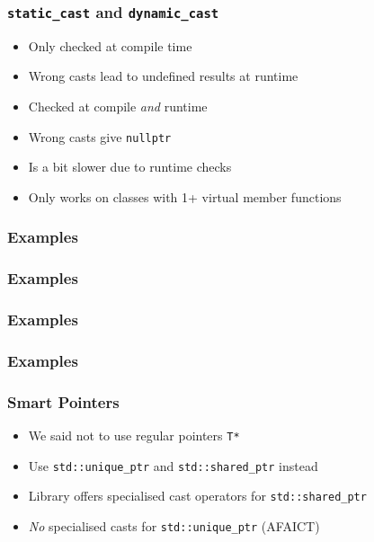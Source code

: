 \begin{frame}
  \frametitle{\texttt{static\_cast} and \texttt{dynamic\_cast}}
  \begin{itemize}
    \item Only checked at compile time
    \item Wrong casts lead to undefined results at runtime
  \end{itemize}
  \vskip5mm
  \begin{itemize}
    \item Checked at compile \emph{and} runtime
    \item Wrong casts give \texttt{nullptr}
    \item Is a bit slower due to runtime checks
    \item Only works on classes with 1+ virtual member functions
  \end{itemize}
\end{frame}

\begin{frame}
  \frametitle{Examples}
\end{frame}

\begin{frame}
  \frametitle{Examples}
\end{frame}

\begin{frame}
  \frametitle{Examples}
\end{frame}

\begin{frame}
  \frametitle{Examples}
\end{frame}

\begin{frame}
  \frametitle{Smart Pointers}
  \begin{itemize}
    \item We said not to use regular pointers {\tt T*}
    \item Use {\tt std::unique\_ptr} and {\tt std::shared\_ptr} instead
    \item Library offers specialised cast operators for {\tt std::shared\_ptr}
    \item \emph{No} specialised casts for {\tt std::unique\_ptr} (AFAICT)
  \end{itemize}
\end{frame}

